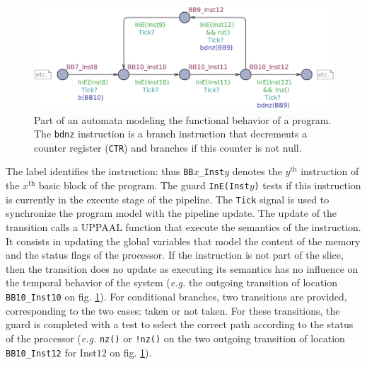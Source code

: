     \begin{figure}
      \centering
      \includegraphics[scale=.5]{fig/program}
      \caption{Part of an automata modeling the functional behavior of a program. The \texttt{bdnz} instruction is a branch instruction that decrements a counter register (\texttt{CTR}) and branches if this counter is not null.}
      \label{fig:program-model}
    \end{figure}

    The label identifies the instruction: thus \texttt{BB$x$\_Inst$y$} denotes the $y^{\text{th}}$ instruction of the $x^{\text{th}}$ basic block of the program.
    The guard \texttt{InE(Inst$y$)} tests if this instruction is currently in the 
    execute stage of the pipeline.
    The \texttt{Tick} signal is used to synchronize the program model with the
    pipeline update.
    The update of the transition calls a UPPAAL function that execute the semantics of the instruction.
    It consists in updating the global variables that model the content of the memory and the status flags of the processor.
    If the instruction is not part of the slice, then the transition does no update as executing its semantics has no influence on the temporal behavior of the system (\textsl{e.g.} the outgoing transition of location
    \texttt{BB10\_Inst10} on fig. \ref{fig:program-model}).
    For conditional branches, two transitions are provided, corresponding to
    the two cases: taken or not taken. 
    For these transitions, the guard is completed with a test to select the
    correct path
    according to the status of the processor (\textsl{e.g.} \texttt{nz()} or
    \texttt{!nz()} on the two outgoing transition of location
    \texttt{BB10\_Inst12} for Inst$12$ on fig. \ref{fig:program-model}).


